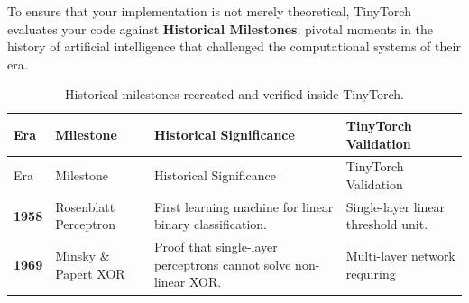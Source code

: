 \documentclass[
  letterpaper,
]{scrbook}
\begin{document}

To ensure that your implementation is not merely theoretical, TinyTorch
evaluates your code against \textbf{Historical Milestones}: pivotal
moments in the history of artificial intelligence that challenged the
computational systems of their era.

\begin{longtable}[]{@{}
  >{\raggedright\arraybackslash}p{}
  >{\raggedright\arraybackslash}p{}
  >{\raggedright\arraybackslash}p{}
  >{\raggedright\arraybackslash}p{}@{}}
\caption{Historical milestones recreated and verified inside
TinyTorch.}\label{tbl-milestones}\tabularnewline
\toprule\noalign{}
\begin{minipage}[b]{\linewidth}\raggedright
Era
\end{minipage} & \begin{minipage}[b]{\linewidth}\raggedright
Milestone
\end{minipage} & \begin{minipage}[b]{\linewidth}\raggedright
Historical Significance
\end{minipage} & \begin{minipage}[b]{\linewidth}\raggedright
TinyTorch Validation
\end{minipage} \\
\midrule\noalign{}
\endfirsthead
\toprule\noalign{}
\begin{minipage}[b]{\linewidth}\raggedright
Era
\end{minipage} & \begin{minipage}[b]{\linewidth}\raggedright
Milestone
\end{minipage} & \begin{minipage}[b]{\linewidth}\raggedright
Historical Significance
\end{minipage} & \begin{minipage}[b]{\linewidth}\raggedright
TinyTorch Validation
\end{minipage} \\
\midrule\noalign{}
\endhead
\bottomrule\noalign{}
\endlastfoot
\textbf{1958} & Rosenblatt Perceptron & First learning machine for
linear binary classification. & Single-layer linear threshold unit. \\
\textbf{1969} & Minsky \& Papert XOR & Proof that single-layer
perceptrons cannot solve non-linear XOR. & Multi-layer network requiring

\end{longtable}
\end{document}
